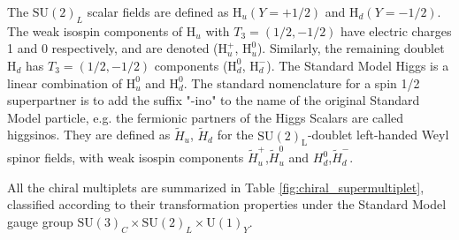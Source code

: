The $\text{SU}(2)_{L}$ scalar fields are defined as $\text{H}_{u}(Y = +1/2)$ and $\text{H}_{d}(Y = -1/2)$. The weak isospin components of $\text{H}_{u}$ with $T_{3} = (1/2, -1/2)$ have electric charges 1 and 0 respectively, and are denoted ($\text{H}^{+}_{u}$, $\text{H}^{0}_{u}$). Similarly, the remaining doublet $\text{H}_{d}$ has $T_{3} = (1/2, -1/2)$ components ($\text{H}^{0}_{d}$, $\text{H}^{-}_{d}$). The Standard Model Higgs is a linear combination of $\text{H}^{0}_{u}$ and $\text{H}^{0}_{d}$. The standard nomenclature for a spin 1/2 superpartner is to add the suffix "-ino" to the name of the original Standard Model particle, e.g. the fermionic partners of the Higgs Scalars are called higgsinos. They are defined as $\widetilde{H}_{u}$, $\widetilde{H}_{d}$ for the $\text{SU}(2)_{\text{L}}$-doublet left-handed Weyl spinor fields, with weak isospin components $\widetilde{H}^{+}_{u}$,$\widetilde{H}^{0}_{u}$ and $H^{0}_{d}$,$\widetilde{H}^{-}_{d}$.

All the chiral multiplets are summarized in Table \ref{fig:chiral_supermultiplet}, classified according to their transformation properties under the Standard Model gauge group $\text{SU}(3)_{C} \times \text{SU}(2)_{L} \times \text{U}(1)_{Y}$.

